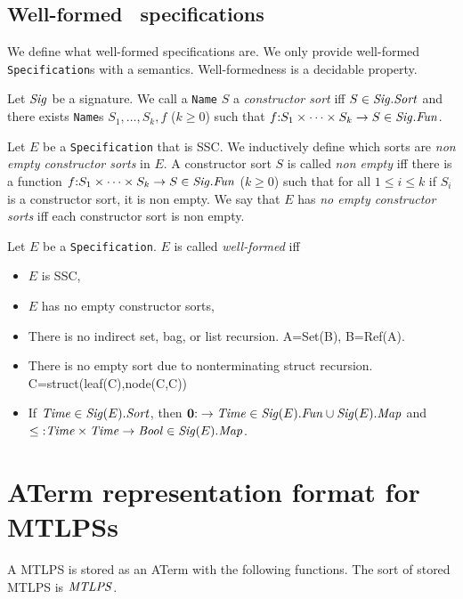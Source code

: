 \documentclass[fleqn,a4paper]{article}
\newcommand{\Sig}{\nm{Sig}}
\newcommand{\Fun}{\nm{Fun}}
\newcommand{\nul}{{\bf 0}}
\begin{document}
\subsection{Well-formed \mcrl\ specifications}
We define what well-formed specifications are. We only provide
well-formed {\tt Specification}s with a semantics. Well-formedness
is a decidable property.
\begin{defn}
Let $\Sig$ be a signature. We call a {\tt Name} $S$ a {\it constructor sort}
iff $S\in\Sig.\Sort$ and there exists {\tt Name}s $S_1,\ldots, S_k, f$ ($k\geq 0$)
such that $f\ap S_1\times \cdots\times S_k\rightarrow S\in \Sig.\Fun$.
\end{defn}
\begin{defn}
Let $E$ be a {\tt Specification} that is SSC.
We inductively define which sorts are {\it non empty constructor sorts} in $E$.
A constructor sort $S$ is called {\it non empty} iff there is a function
$f\ap S_1\times\cdots\times S_k\rightarrow S\in \Sig.\Fun$ ($k\geq 0$) such
that for all $1\leq i\leq k$ if $S_i$ is a constructor sort, it is non empty.
We say
that $E$ has {\em no empty constructor sorts} iff each constructor sort is non
empty.
\end{defn}
\begin{defn}
Let $E$ be a {\tt Specification}. $E$ is called {\it well-formed} iff
\begin{itemize}
\item $E$ is SSC,
\item $E$ has no empty constructor sorts,
\item There is no indirect set, bag, or list recursion. A=Set(B), B=Ref(A).
\item There is no empty sort due to nonterminating struct recursion.
  C=struct(leaf(C),node(C,C))
\item If $\Time\in\Sig(E).\Sort$, then $\nul\ap \rightarrow\Time\in\Sig(E).\Fun\cup \Sig(E).\Map$
  and $\leq\ap\Time\times\Time\rightarrow\Bool\in \Sig(E).\Map$.
\end{itemize}
\end{defn}

\newpage
\section{ATerm representation format for MTLPSs}
A MTLPS is stored as an ATerm with the following functions. The sort
of stored MTLPS is $\mathit{MTLPS}$.
\end{document}
